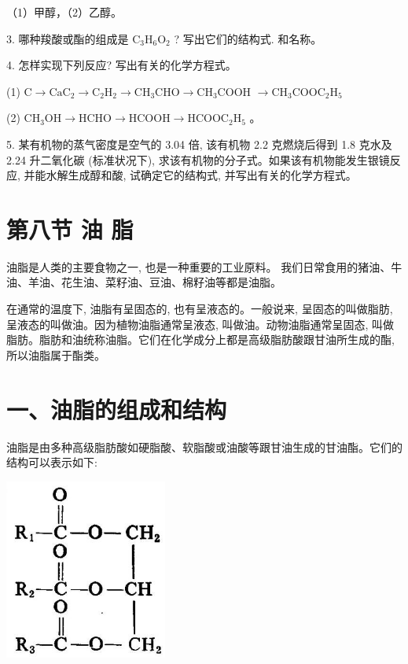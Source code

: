 \documentclass[10pt]{article}
\begin{document}
（1）甲醇，（2）乙醇。

3. 哪种羧酸或酯的组成是 \({\mathrm{C}}_{3}{\mathrm{H}}_{6}{\mathrm{O}}_{2}\) ? 写出它们的结构式. 和名称。

4. 怎样实现下列反应? 写出有关的化学方程式。

(1) \(\mathrm{C} \rightarrow {\mathrm{{CaC}}}_{2} \rightarrow {\mathrm{C}}_{2}{\mathrm{H}}_{2} \rightarrow {\mathrm{{CH}}}_{3}\mathrm{{CHO}} \rightarrow {\mathrm{{CH}}}_{3}\mathrm{{COOH}}\) \(\rightarrow {\mathrm{{CH}}}_{3}{\mathrm{{COOC}}}_{2}{\mathrm{H}}_{5}\)

(2) \({\mathrm{{CH}}}_{3}\mathrm{{OH}} \rightarrow \mathrm{{HCHO}} \rightarrow \mathrm{{HCOOH}} \rightarrow {\mathrm{{HCOOC}}}_{2}{\mathrm{H}}_{5}\) 。

5. 某有机物的蒸气密度是空气的 3.04 倍, 该有机物 2.2 克燃烧后得到 1.8 克水及 2.24 升二氧化碳 (标准状况下), 求该有机物的分子式。如果该有机物能发生银镜反应, 并能水解生成醇和酸, 试确定它的结构式, 并写出有关的化学方程式。

\section*{第八节 油 脂}

油脂是人类的主要食物之一, 也是一种重要的工业原料。 我们日常食用的猪油、牛油、羊油、花生油、菜籽油、豆油、棉籽油等都是油脂。

在通常的温度下, 油脂有呈固态的, 也有呈液态的。一般说来, 呈固态的叫做脂肪, 呈液态的叫做油。因为植物油脂通常呈液态, 叫做油。动物油脂通常呈固态, 叫做脂肪。脂肪和油统称油脂。它们在化学成分上都是高级脂肪酸跟甘油所生成的酯, 所以油脂属于酯类。

\section*{一、油脂的组成和结构}

油脂是由多种高级脂肪酸如硬脂酸、软脂酸或油酸等跟甘油生成的甘油酯。它们的结构可以表示如下:

\begin{center}
\includegraphics[max width=0.4\textwidth]{images/01912d16-be99-77bb-9535-4f3ed8d9946f_143_470405.jpg}
\end{center}
\end{document}
